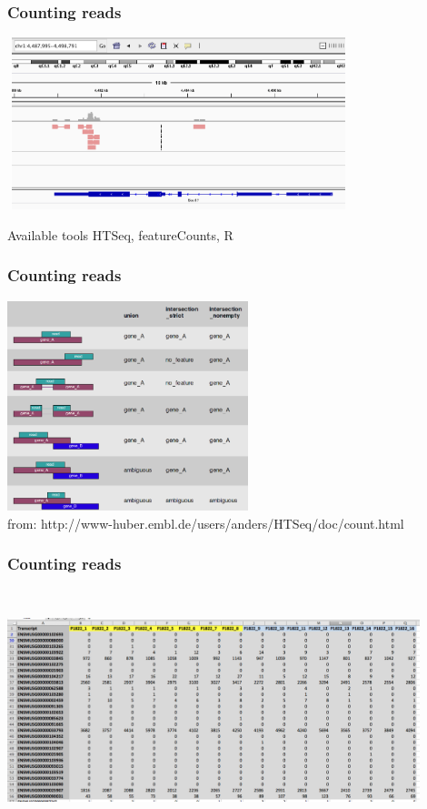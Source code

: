 \documentclass{beamer}\usepackage[]{graphicx}\usepackage[]{color}
\begin{document}
\begin{frame}
\frametitle{Counting reads}
\begin{center}
\includegraphics[width=10cm, height=5cm]{Images/counts_IGV.png}
\end{center}
\begin{block}{Available tools}
HTSeq, featureCounts, R
\end{block}
\end{frame}

\begin{frame}
\frametitle{Counting reads}
\centering
\includegraphics[width=7cm]{Images/counts_HTseq.png}
  \\{\tiny{from: http://www-huber.embl.de/users/anders/HTSeq/doc/count.html}}
\end{frame}

\begin{frame}
\frametitle{Counting reads}
\begin{center}
\includegraphics[width=12cm, height=7cm]{Images/counts_table.png}
\end{center}
\end{frame}
\end{document}
